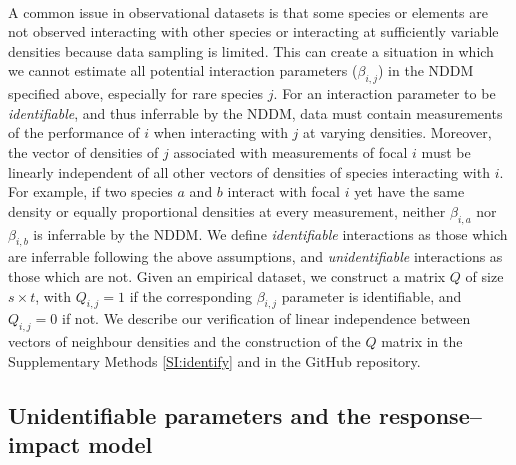 \documentclass[a4,12pt]{article}
\begin{document}
\begin{refsection}
    \paragraph{}
    A common issue in observational datasets is that some species or elements are not observed interacting with other species or interacting at sufficiently variable densities because data sampling is limited. This can create a situation in which we cannot estimate all potential interaction parameters ($\beta_{i,j}$) in the NDDM specified above, especially for rare species $j$. For an interaction parameter to be \textit{identifiable}, and thus inferrable by the NDDM, data must contain measurements of the performance of $i$ when interacting with $j$ at varying densities. Moreover, the vector of densities of $j$ associated with measurements of focal $i$ must be linearly independent of all other vectors of densities of species interacting with $i$. For example, if two species $a$ and $b$ interact with focal $i$ yet have the same density or equally proportional densities at every measurement, neither $\beta_{i, a}$ nor $\beta_{i, b}$ is inferrable by the NDDM. We define \textit{identifiable} interactions as those which are inferrable following the above assumptions, and \textit{unidentifiable} interactions as those which are not. Given an empirical dataset, we construct a matrix $Q$ of size $s \times t$, with $Q_{i, j} = 1$ if the corresponding $\beta_{i, j}$ parameter is identifiable, and $Q_{i, j} = 0$ if not. We describe our verification of linear independence between vectors of neighbour densities and the construction of the $Q$ matrix in the Supplementary Methods \ref{SI:identify} and in the GitHub repository.
    
    \subsection{Unidentifiable parameters and the response--impact model}
    \label{meth:rim}


\end{refsection}
\end{document}
